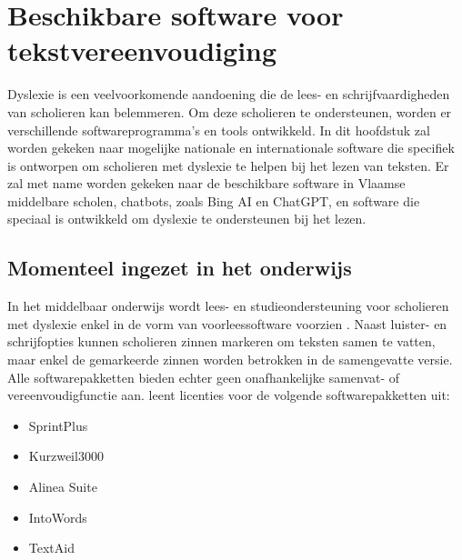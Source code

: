 


\section{Beschikbare software voor tekstvereenvoudiging}

Dyslexie is een veelvoorkomende aandoening die de lees- en schrijfvaardigheden van scholieren kan belemmeren. Om deze scholieren te ondersteunen, worden er verschillende softwareprogramma's en tools ontwikkeld. In dit hoofdstuk zal worden gekeken naar mogelijke nationale en internationale software die specifiek is ontworpen om scholieren met dyslexie te helpen bij het lezen van teksten. Er zal met name worden gekeken naar de beschikbare software in Vlaamse middelbare scholen, chatbots, zoals Bing AI en ChatGPT, en software die speciaal is ontwikkeld om dyslexie te ondersteunen bij het lezen.

\subsection{Momenteel ingezet in het onderwijs}


In het middelbaar onderwijs wordt lees- en studieondersteuning voor scholieren met dyslexie enkel in de vorm van voorleessoftware voorzien \autocite{DeCraemer2018, OnderwijsVlaanderen2023}. Naast luister- en schrijfopties kunnen scholieren zinnen markeren om teksten samen te vatten, maar enkel de gemarkeerde zinnen worden betrokken in de samengevatte versie. Alle softwarepakketten bieden echter geen onafhankelijke samenvat- of vereenvoudigfunctie aan. \textcite{OnderwijsVlaanderen2023} leent licenties voor de volgende softwarepakketten uit:

\begin{itemize}
	\item SprintPlus
	\item Kurzweil3000
	\item Alinea Suite
	\item IntoWords
	\item TextAid
\end{itemize}


